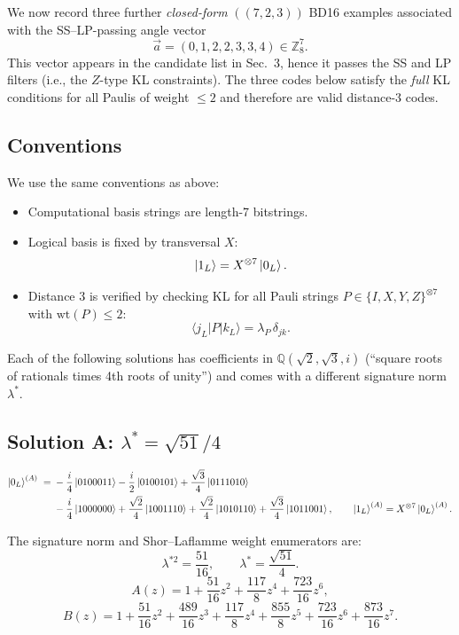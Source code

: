 \documentclass[11pt]{article}
\begin{document}
We now record three further \emph{closed-form} \(((7,2,3))\) BD16 examples associated with the SS--LP-passing angle vector
\[
\vec a=(0,1,2,2,3,3,4)\in\mathbb{Z}_8^7.
\]
This vector appears in the candidate list in Sec.~3, hence it passes the SS and LP filters (i.e., the \(Z\)-type KL constraints). The three codes below satisfy the \emph{full} KL conditions for all Paulis of weight \(\le 2\) and therefore are valid distance-3 codes.

\subsection{Conventions}

We use the same conventions as above:
\begin{itemize}
\item Computational basis strings are length-7 bitstrings.
\item Logical basis is fixed by transversal \(X\):
\[
\ket{1_L}=X^{\otimes 7}\ket{0_L}.
\]
\item Distance \(3\) is verified by checking KL for all Pauli strings \(P\in\{I,X,Y,Z\}^{\otimes 7}\) with \(\mathrm{wt}(P)\le 2\):
\[
\langle j_L|P|k_L\rangle=\lambda_P\,\delta_{jk}.
\]
\end{itemize}

Each of the following solutions has coefficients in \(\mathbb{Q}(\sqrt2,\sqrt3,i)\) (``square roots of rationals times 4th roots of unity'') and comes with a different signature norm \(\lambda^\ast\).

\subsection{Solution A: \texorpdfstring{$\lambda^\ast=\sqrt{51}/4$}{lambda*=sqrt(51)/4}}

\[
\begin{aligned}
\ket{0_L}^{(A)} \;=\;
&-\frac{i}{4}\ket{0100011}
-\frac{i}{2}\ket{0100101}
+\frac{\sqrt3}{4}\ket{0111010}\\
&-\frac{i}{4}\ket{1000000}
+\frac{\sqrt2}{4}\ket{1001110}
+\frac{\sqrt2}{4}\ket{1010110}
+\frac{\sqrt3}{4}\ket{1011001},
\qquad
\ket{1_L}^{(A)} = X^{\otimes 7}\ket{0_L}^{(A)}.
\end{aligned}
\]

The signature norm and Shor--Laflamme weight enumerators are:
\[
\boxed{\lambda^{\ast 2}=\frac{51}{16},\qquad \lambda^\ast=\frac{\sqrt{51}}{4}.}
\]
\[
A(z)=1+\frac{51}{16}z^2+\frac{117}{8}z^4+\frac{723}{16}z^6,
\]
\[
B(z)=1+\frac{51}{16}z^2+\frac{489}{16}z^3+\frac{117}{8}z^4+\frac{855}{8}z^5+\frac{723}{16}z^6+\frac{873}{16}z^7.
\]
\end{document}
